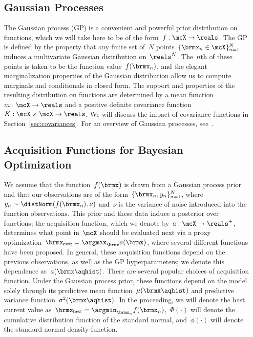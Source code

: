 \documentclass[aos,preprint]{imsart}
\begin{document}
\subsection{Gaussian Processes}
The Gaussian process (GP) is a convenient and powerful prior
distribution on functions, which we will take here to be of the
form~${f:\mcX\to\reals}$.  The GP is defined by the property that any
finite set of~$N$ points~$\{\brmx_n\in\mcX\}^N_{n=1}$ induces a
multivariate Gaussian distribution on~$\reals^N$.  The~$n$th of these
points is taken to be the function value~$f(\brmx_n)$, and the elegant
marginalization properties of the Gaussian distribution allow us to
compute marginals and conditionals in closed form.  The support and
properties of the resulting distribution on functions are determined
by a mean function~${m:\mcX\to\reals}$ and a positive definite
covariance function~${K:\mcX\times\mcX\to\reals}$.  We will discuss
the impact of covariance functions in Section~\ref{sec:covariances}.
For an overview of Gaussian processes, see~\citet{Rasmussen2006}.

\subsection{Acquisition Functions for Bayesian Optimization}
We assume that the function~$f(\brmx)$ is drawn from a Gaussian
process prior and that our observations are of the
form~$\{\brmx_n,y_n\}^N_{n=1}$,
where~${y_n\sim\distNorm(f(\brmx_n),\nu)}$ and~$\nu$ is the variance
of noise introduced into the function observations.  This prior and
these data induce a posterior over functions; the acquisition
function, which we denote by~${a:\mcX\to\reals^{+}}$, determines what
point in~$\mcX$ should be evaluated next via a proxy
optimization~${\brmx_{\sf{next}} = \argmax_{\brmx} a(\brmx)}$, where
several different functions have been proposed.  In general, these
acquisition functions depend on the previous observations,
as well as the GP hyperparameters; we denote this dependence
as~$a(\brmx\aqhist)$.  There are several popular
choices of acquisition function.  Under the Gaussian process prior,
these functions depend on the model solely through its predictive mean
function~$\mu(\brmx\aqhist)$ and predictive
variance function~$\sigma^2(\brmx\aqhist)$.  In
the proceeding, we will denote the best current value
as~${\brmx_{\sf{best}}=\argmin_{\brmx_n}f(\brmx_n)}$,~$\Phi(\cdot)$
will denote the cumulative distribution function of the standard
normal, and~$\phi(\cdot)$ will denote the standard normal density
function.
\end{document}
